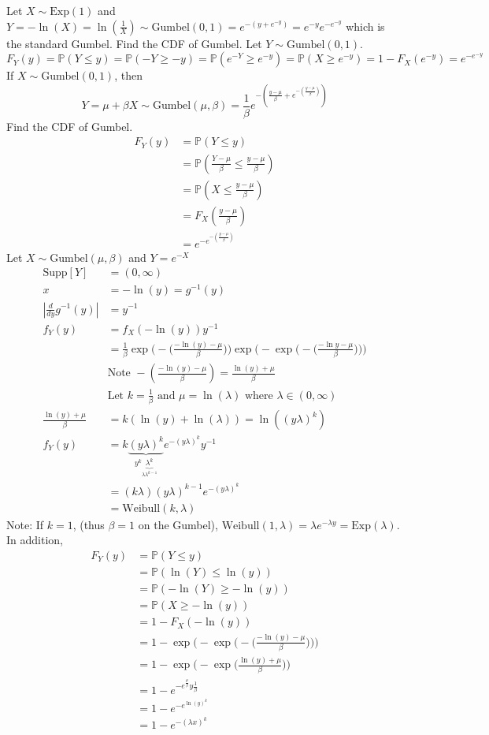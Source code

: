 \documentclass[12pt]{article}
\newcommand{\prob}[1]{\mathbb{P}(#1)}
\newcommand{\supp}[1]{\text{Supp}[ #1 ]}
\newcommand{\ginvy}{g^{-1}(y)}
\begin{document}
Let $X \sim \text{Exp}(1)$ and $Y = -\ln(X) = \ln(\frac{1}{X}) \sim \text{Gumbel}(0,1) = e^{-(y + e^{-y})} = e^{-y}e^{-e^{-y}}$ which is the standard Gumbel. Find the CDF of Gumbel. Let $Y \sim \text{Gumbel}(0,1)$. 
$$F_Y(y) = \prob{Y \leq y} = \prob{-Y \geq -y} = \prob{e^{-Y} \geq e^{-y}} = \prob{X \geq e^{-y}} = 1 - F_X(e^{-y}) = e^{-e^{-y}} $$ 
If $X \sim \text{Gumbel}(0,1)$, then $$Y = \mu + \beta X \sim \text{Gumbel}(\mu, \beta) = \frac{1}{\beta}e^{-(\frac{y - \mu}{\beta} + e^{-(\frac{y - \mu}{\beta})})} $$ Find the CDF of Gumbel. 
$$\begin{aligned} F_Y(y) &= \prob{Y \leq y} \\ &= \prob{\frac{Y - \mu}{\beta} \leq \frac{y - \mu}{\beta}} \\ &= \prob{X \leq \frac{y - \mu}{\beta}} \\ &= F_X(\frac{y - \mu}{\beta}) \\ &= e^{-e^{-(\frac{y - \mu}{\beta})}} \end{aligned} $$ 
Let $X \sim \text{Gumbel}(\mu, \beta)$ and $Y = e^{-X}$ $$\begin{aligned} 
\supp{Y} &= (0, \infty) \\ x &= -\ln(y) = \ginvy \\ |\frac{d}{dy} \ginvy | &= y^{-1} \\ f_Y(y) &= f_X(-\ln(y))y^{-1} \\ &= \frac{1}{\beta}\exp\Big(-\Big( \frac{-\ln(y) - \mu}{\beta}\Big)\Big)\exp\Big(-\exp\Big(-\Big(\frac{-\ln{y} - \mu}{\beta}\Big)\Big)\Big) \\ &\text{Note } -(\frac{-\ln(y) - \mu}{\beta}) = \frac{\ln(y) + \mu}{\beta} \\ &\text{Let } k = \frac{1}{\beta} \text{ and } \mu = \ln(\lambda) \text{ where } \lambda \in (0, \infty) \\ \frac{\ln(y) + \mu}{\beta} &= k(\ln(y) + \ln(\lambda)) = \ln((y\lambda)^k) \\ f_Y(y) &= k\underbrace{(y\lambda)^k}_{y^k \underbrace{\lambda^k}_{\lambda \lambda^{k - 1}}} e^{-(y\lambda)^k}y^{-1} \\ &= (k\lambda)(y\lambda)^{k - 1}e^{-(y\lambda)^k} \\ &= \text{Weibull}(k, \lambda) \end{aligned} $$ 
Note: If $k = 1$, (thus $\beta = 1$ on the Gumbel), $\text{Weibull}(1,\lambda) = \lambda e^{-\lambda y} = \text{Exp}(\lambda)$. In addition, $$\begin{aligned} 
F_Y(y) &= \prob{Y \leq y} \\ &= \prob{\ln(Y) \leq \ln(y)} \\ &= \prob{-\ln(Y) \geq -\ln(y)} \\ &= \prob{X \geq -\ln(y)} \\ &= 1 - F_X(-\ln(y)) \\ &= 1 - \exp\Big(-\exp\Big( -(\frac{-\ln(y) - \mu}{\beta}\Big)\Big)\Big) \\ &= 1 - \exp\Big( -\exp\Big( \frac{\ln(y) + \mu}{\beta}\Big)\Big) \\ &= 1 - e^{-e^{\frac{\mu}{\beta}} y\frac{1}{\beta}} \\ &= 1 - e^{-e^{\ln(y)^k}} \\ &= 1 - e^{-(\lambda x)^k} \end{aligned} $$ 
\end{document}
